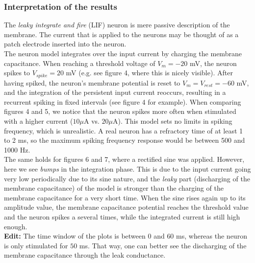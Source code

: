 \documentclass[
a4paper, 
12pt, 
]{article}
\begin{document}
\subsubsection*{Interpretation of the results}
The \textit{leaky integrate and fire} (LIF) neuron is mere passive description of the membrane. The current that is applied to the neurons may be thought of as a patch electrode inserted into the neuron.\\
The neuron model integrates over the input current by charging the membrane capacitance. When reaching a threshold voltage of $V_m = -20$ mV, the neuron spikes to $V_{spike} = 20$ mV (e.g. see figure 4, where this is nicely visible). After having spiked, the neuron's membrane potential is reset to $V_m = V_{rest} = -60$ mV, and the integration of the persistent input current reoccurs, resulting in a recurrent spiking in fixed intervals (see figure 4 for example). When comparing figures 4 and 5, we notice that the neuron spikes more often when stimulated with a higher current ($10\mu$A vs. $20\mu$A). This model sets no limits in spiking frequency, which is unrealistic. A real neuron has a refractory time of at least 1 to 2 ms, so the maximum spiking frequency response would be between 500 and 1000 Hz.\\
The same holds for figures 6 and 7, where a rectified sine was applied. However, here we see \emph{bumps} in the integration phase. This is due to the input current going very low periodically due to its sine nature, and the \emph{leaky} part (discharging of the membrane capacitance) of the model is stronger than the charging of the membrane capacitance for a very short time. When the sine rises again up to its amplitude value, the membrane capacitance potential reaches the threshold value and the neuron spikes a several times, while the integrated current is still high enough. \\
\textbf{Edit:} The time window of the plots is between $0$ and $60$ ms, whereas the neuron is only stimulated for $50$ ms. That way, one can better see the discharging of the membrane capacitance through the leak conductance. 
	
	
\end{document}
